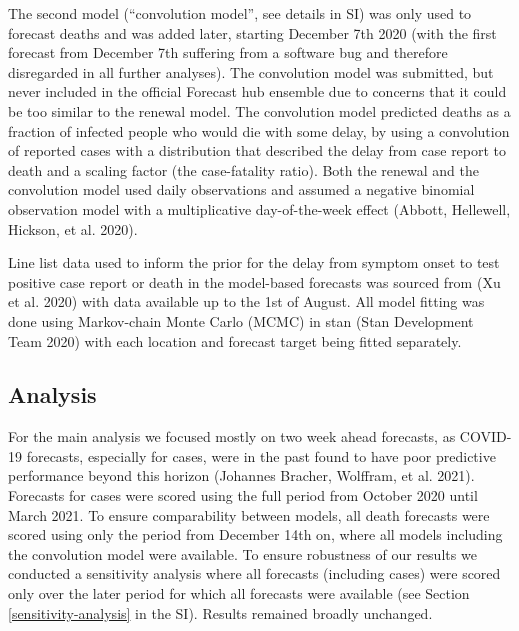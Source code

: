 \documentclass[
]{article}
\begin{document}
The second model (``convolution model'', see details in SI) was only used to forecast deaths and was added later, starting December 7th 2020 (with the first forecast from December 7th suffering from a software bug and therefore disregarded in all further analyses). The convolution model was submitted, but never included in the official Forecast hub ensemble due to concerns that it could be too similar to the renewal model. The convolution model predicted deaths as a fraction of infected people who would die with some delay, by using a convolution of reported cases with a distribution that described the delay from case report to death and a scaling factor (the case-fatality ratio). Both the renewal and the convolution model used daily observations and assumed a negative binomial observation model with a multiplicative day-of-the-week effect (Abbott, Hellewell, Hickson, et al. 2020).

Line list data used to inform the prior for the delay from symptom onset to test positive case report or death in the model-based forecasts was sourced from (Xu et al. 2020) with data available up to the 1st of August. All model fitting was done using Markov-chain Monte Carlo (MCMC) in stan (Stan Development Team 2020) with each location and forecast target being fitted separately.

\hypertarget{analysis}{%
\subsection{Analysis}\label{analysis}}

For the main analysis we focused mostly on two week ahead forecasts, as COVID-19 forecasts, especially for cases, were in the past found to have poor predictive performance beyond this horizon (Johannes Bracher, Wolffram, et al. 2021). Forecasts for cases were scored using the full period from October 2020 until March 2021. To ensure comparability between models, all death forecasts were scored using only the period from December 14th on, where all models including the convolution model were available. To ensure robustness of our results we conducted a sensitivity analysis where all forecasts (including cases) were scored only over the later period for which all forecasts were available (see Section \ref{sensitivity-analysis} in the SI). Results remained broadly unchanged.
\end{document}
